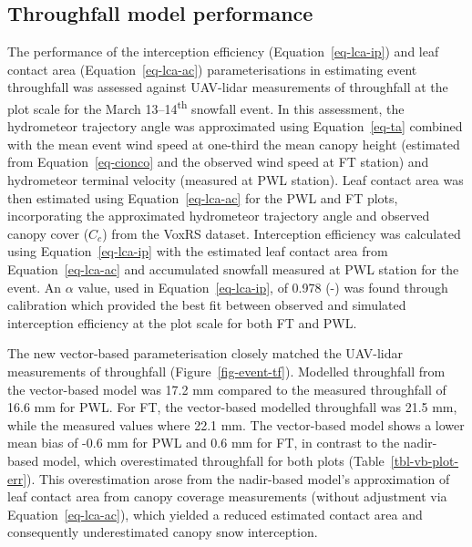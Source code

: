 \documentclass[
  letterpaper,
]{tex/uofsthesis-cs}
\begin{document}
\subsection{Throughfall model
performance}\label{throughfall-model-performance}

The performance of the interception efficiency
(Equation~\ref{eq-lca-ip}) and leaf contact area
(Equation~\ref{eq-lca-ac}) parameterisations in estimating event
throughfall was assessed against UAV-lidar measurements of throughfall
at the plot scale for the March 13--14\textsuperscript{th} snowfall
event. In this assessment, the hydrometeor trajectory angle was
approximated using Equation~\ref{eq-ta} combined with the mean event
wind speed at one-third the mean canopy height (estimated from
Equation~\ref{eq-cionco} and the observed wind speed at FT station) and
hydrometeor terminal velocity (measured at PWL station). Leaf contact
area was then estimated using Equation~\ref{eq-lca-ac} for the PWL and
FT plots, incorporating the approximated hydrometeor trajectory angle
and observed canopy cover (\(C_c\)) from the VoxRS dataset. Interception
efficiency was calculated using Equation~\ref{eq-lca-ip} with the
estimated leaf contact area from Equation~\ref{eq-lca-ac} and
accumulated snowfall measured at PWL station for the event. An
\(\alpha\) value, used in Equation~\ref{eq-lca-ip}, of 0.978 (-) was
found through calibration which provided the best fit between observed
and simulated interception efficiency at the plot scale for both FT and
PWL.

The new vector-based parameterisation closely matched the UAV-lidar
measurements of throughfall (Figure~\ref{fig-event-tf}). Modelled
throughfall from the vector-based model was 17.2 mm compared to the
measured throughfall of 16.6 mm for PWL. For FT, the vector-based
modelled throughfall was 21.5 mm, while the measured values where 22.1
mm. The vector-based model shows a lower mean bias of -0.6 mm for PWL
and 0.6 mm for FT, in contrast to the nadir-based model, which
overestimated throughfall for both plots (Table~\ref{tbl-vb-plot-err}).
This overestimation arose from the nadir-based model's approximation of
leaf contact area from canopy coverage measurements (without adjustment
via Equation~\ref{eq-lca-ac}), which yielded a reduced estimated contact
area and consequently underestimated canopy snow interception.
\end{document}
